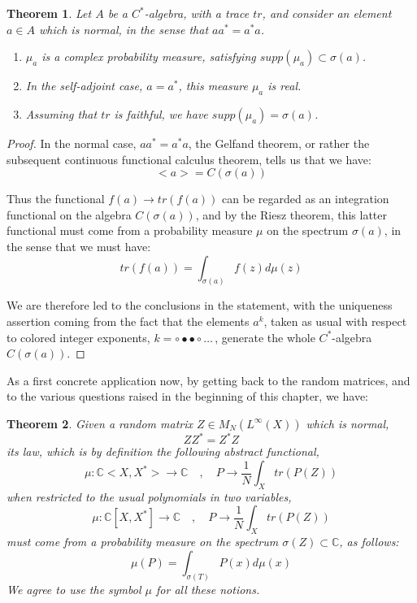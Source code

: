 \documentclass[12pt]{amsbook}
\newtheorem{theorem}{Theorem}[chapter]
\begin{document}

\begin{theorem}
Let $A$ be a $C^*$-algebra, with a trace $tr$, and consider an element $a\in A$ which is normal, in the sense that $aa^*=a^*a$.
\begin{enumerate}
\item $\mu_a$ is a complex probability measure, satisfying $supp(\mu_a)\subset\sigma(a)$.

\item In the self-adjoint case, $a=a^*$, this measure $\mu_a$ is real.

\item Assuming that $tr$ is faithful, we have $supp(\mu_a)=\sigma(a)$.
\end{enumerate}
\end{theorem}

\begin{proof}
In the normal case, $aa^*=a^*a$, the Gelfand theorem, or rather the subsequent continuous functional calculus theorem, tells us that we have: 
$$<a>=C(\sigma(a))$$

Thus the functional $f(a)\to tr(f(a))$ can be regarded as an integration functional on the algebra $C(\sigma(a))$, and by the Riesz theorem, this latter functional must come from a probability measure $\mu$ on the spectrum $\sigma(a)$, in the sense that we must have:
$$tr(f(a))=\int_{\sigma(a)}f(z)d\mu(z)$$

We are therefore led to the conclusions in the statement, with the uniqueness assertion coming from the fact that the elements $a^k$, taken as usual with respect to colored integer exponents, $k=\circ\bullet\bullet\circ\ldots$\,, generate the whole $C^*$-algebra $C(\sigma(a))$.
\end{proof}

As a first concrete application now, by getting back to the random matrices, and to the various questions raised in the beginning of this chapter, we have:

\begin{theorem}
Given a random matrix $Z\in M_N(L^\infty(X))$ which is normal, 
$$ZZ^*=Z^*Z$$
its law, which is by definition the following abstract functional,
$$\mu:\mathbb C<X,X^*>\to\mathbb C\quad,\quad 
P\to\frac{1}{N}\int_Xtr(P(Z))$$
when restricted to the usual polynomials in two variables,
$$\mu:\mathbb C[X,X^*]\to\mathbb C\quad,\quad 
P\to\frac{1}{N}\int_Xtr(P(Z))$$
must come from a probability measure on the spectrum $\sigma(Z)\subset\mathbb C$, as follows:
$$\mu(P)=\int_{\sigma(T)}P(x)d\mu(x)$$
We agree to use the symbol $\mu$ for all these notions.
\end{theorem}
\end{document}

